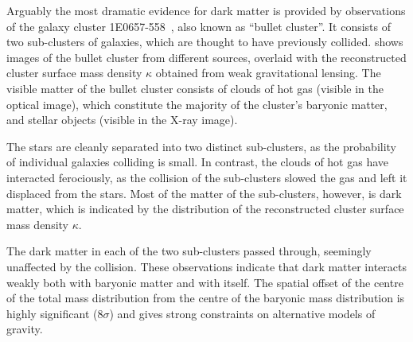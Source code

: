 Arguably the most dramatic evidence for dark matter is provided by observations of the galaxy cluster 1E\num{0657}-\num{558}~\cite{Tucker1998}, also known as ``bullet cluster''. It consists of two sub-clusters of galaxies, which are thought to have previously collided.  shows images of the bullet cluster from different sources, overlaid with the reconstructed cluster surface mass density \(\kappa\) obtained from weak gravitational lensing. The visible matter of the bullet cluster consists of clouds of hot gas (visible in the optical image), which constitute the majority of the cluster's baryonic matter, and stellar objects (visible in the X-ray image).

The stars are cleanly separated into two distinct sub-clusters, as the probability of individual galaxies colliding is small. In contrast, the clouds of hot gas have interacted ferociously, as the collision of the sub-clusters slowed the gas and left it displaced from the stars. Most of the matter of the sub-clusters, however, is dark matter, which is indicated by the distribution of the reconstructed cluster surface mass density \(\kappa\).

The dark matter in each of the two sub-clusters passed through, seemingly unaffected by the collision. These observations indicate that dark matter interacts weakly both with baryonic matter and with itself. The spatial offset of the centre of the total mass distribution from the centre of the baryonic mass distribution is highly significant (\(8\sigma\)) and gives strong constraints on alternative models of gravity.

